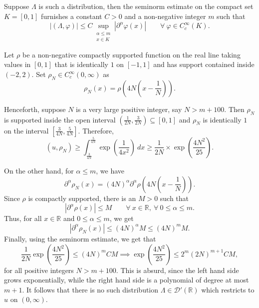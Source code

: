\documentclass[10pt]{amsart}
\theoremstyle{thmstyle}
\theoremstyle{defstyle}
\newcommand{\R}{\mathbb{R}}
\renewcommand{\le}{\leqslant}
\renewcommand{\ge}{\geqslant}
\begin{document}
Suppose $\Lambda$ is such a distribution, then the seminorm estimate on the compact set $K = [0, 1]$ furnishes a constant $C > 0$ and a non-negative integer $m$ such that 
\begin{equation*}
    \left|(\Lambda,\varphi)\right|\le C\sup_{\substack{\alpha\le m\\ x\in K}}|\partial^\alpha\varphi(x)|\qquad\forall~\varphi\in C_c^\infty(K).
\end{equation*}

Let $\rho$ be a non-negative compactly supported function on the real line taking values in $[0, 1]$ that is identically $1$ on $[-1, 1]$ and has support contained inside $(-2, 2)$. Set $\rho_N\in C_c^\infty(0, \infty)$ as 
\begin{equation*}
    \rho_N(x) = \rho\left(4N\left(x - \frac{1}{N}\right)\right).
\end{equation*}

Henceforth, suppose $N$ is a very large positive integer, say $N > m + 100$. Then $\rho_N$ is supported inside the open interval $\left(\frac{1}{2N}, \frac{3}{2N}\right)\subseteq[0, 1]$ and $\rho_N$ is identically $1$ on the interval $\left[\frac{3}{4N}, \frac{5}{4N}\right]$. Therefore, 
\begin{equation*}
    (u, \rho_N)\ge\int_{\frac{3}{4N}}^{\frac{5}{4N}}\exp\left(\frac{1}{4x^2}\right)~dx\ge\frac{1}{2N}\times\exp\left(\frac{4N^2}{25}\right).
\end{equation*}

On the other hand, for $\alpha\le m$, we have 
\begin{equation*}
    \partial^\alpha\rho_N(x) = (4N)^\alpha\partial^\alpha\rho\left(4N\left(x - \frac{1}{N}\right)\right).
\end{equation*}
Since $\rho$ is compactly supported, there is an $M > 0$ such that 
\begin{equation*}
    \left|\partial^\alpha\rho(x)\right|\le M\qquad\forall~x\in\R,~\forall~0\le\alpha\le m.
\end{equation*}
Thus, for all $x\in\R$ and $0\le\alpha\le m$, we get 
\begin{equation*}
    \left|\partial^\alpha\rho_N(x)\right|\le (4N)^\alpha M\le (4N)^m M.
\end{equation*}
Finally, using the seminorm estimate, we get that 
\begin{equation*}
    \frac{1}{2N}\exp\left(\frac{4N^2}{25}\right)\le (4N)^m CM\implies\exp\left(\frac{4N^2}{25}\right)\le 2^m (2N)^{m + 1} CM,
\end{equation*}
for all positive integers $N > m + 100$. This is absurd, since the left hand side grows exponentially, while the right hand side is a polynomial of degree at most $m + 1$. It follows that there is no such distribution $\Lambda\in\mathscr D'(\R)$ which restricts to $u$ on $(0,\infty)$.
\end{document}
